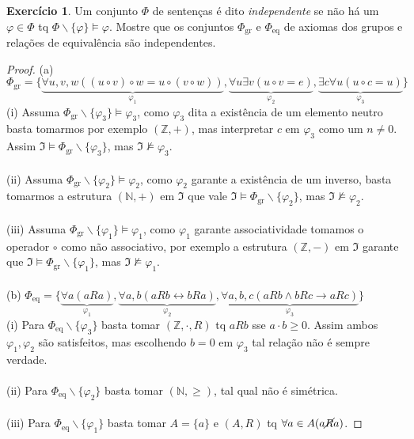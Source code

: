 \documentclass[11pt]{article}
\theoremstyle{definition}
\newtheorem{exer}{Exercício}
\newcommand{\sse}{\leftrightarrow}
\newcommand{\mf}[1]{\mathfrak{#1}}
\newcommand{\mbb}[1]{\mathbb{#1}}
\begin{document}
\begin{exer}
Um conjunto $\Phi$ de sentenças é dito \textit{independente} se não há um $\varphi\in\Phi$ tq $\Phi\backslash\{\varphi\}\vDash\varphi$. Mostre que os conjuntos $\Phi_\text{gr}$ e $\Phi_\text{eq}$ de axiomas dos grupos e relações de equivalência são independentes.

\begin{proof}
(a) $\Phi_\text{gr} = \{\underbrace{\forall u,v,w((u\circ v)\circ w=u\circ(v\circ w))}_{\varphi_1},\underbrace{\forall u\exists v(u\circ v=e)}_{\varphi_2},\underbrace{\exists c\forall u(u\circ c=u)}_{\varphi_3}\}$\\
(i) Assuma $\Phi_\text{gr}\backslash\{\varphi_3\}\vDash\varphi_3$, como $\varphi_3$ dita a existência de um elemento neutro basta tomarmos por exemplo $(\mbb{Z},+)$, mas interpretar $c$ em $\varphi_3$ como um $n\ne0$. Assim $\mf{I}\vDash\Phi_\text{gr}\backslash\{\varphi_3\}$, mas $\mf{I}\nvDash\varphi_3$.\\\\
(ii) Assuma $\Phi_\text{gr}\backslash\{\varphi_2\}\vDash\varphi_2$, como $\varphi_2$ garante a existência de um inverso, basta tomarmos a estrutura $(\mbb{N},+)$ em $\mf{I}$ que vale $\mf{I}\vDash\Phi_\text{gr}\backslash\{\varphi_2\}$, mas $\mf{I}\nvDash\varphi_2$.\\\\
(iii) Assuma $\Phi_\text{gr}\backslash\{\varphi_1\}\vDash\varphi_1$, como $\varphi_1$ garante associatividade tomamos o operador $\circ$ como não associativo, por exemplo a estrutura $(\mbb{Z},-)$ em $\mf{I}$ garante que $\mf{I}\vDash\Phi_\text{gr}\backslash\{\varphi_1\}$, mas $\mf{I}\nvDash\varphi_1$.\\\\
(b) $\Phi_\text{eq} = \{\underbrace{\forall a(aRa)}_{\varphi_1},\underbrace{\forall a,b(aRb\sse bRa)}_{\varphi_2},\underbrace{\forall a,b,c(aRb\wedge bRc\to aRc)}_{\varphi_3}\}$\\
(i) Para $\Phi_\text{eq}\backslash\{\varphi_3\}$ basta tomar $(\mbb{Z},\cdot,R)$ tq $aRb$ sse $a\cdot b \ge 0$. Assim ambos $\varphi_1,\varphi_2$ são satisfeitos, mas escolhendo $b=0$ em $\varphi_3$ tal relação não é sempre verdade.\\\\
(ii) Para $\Phi_\text{eq}\backslash\{\varphi_2\}$ basta tomar $(\mbb{N},\ge)$, tal qual não é simétrica.\\\\
(iii) Para $\Phi_\text{eq}\backslash\{\varphi_1\}$ basta tomar $A=\{a\}$ e $(A,R)$ tq $\forall a\in A(a\cancel{R}a)$.
\end{proof}
\end{exer}
\end{document}
